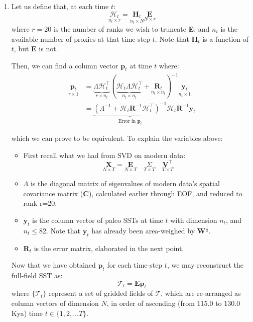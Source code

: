 \documentclass{article}
\begin{document}
\begin{enumerate}
    \item Let us define that, at each time $t$:
    $$\underset{n_t \times r}{\mathcal{H}_t} = \underset{n_t \times N}{\mathbf{H}_t} \underset{N \times r}{\mathbf{E}}$$
    where $r=20$ is the number of ranks we wish to truncate \textbf{E}, and $n_t$ is the available number of proxies at that time-step $t$. Note that $\textbf{H}_t$ is a function of $t$, but \textbf{E} is not.
    
    Then, we can find a column vector $\textbf{p}_t$ at time $t$ where:
        \begin{align*}
            \underset{r \times 1}{\textbf{p}_t} &= \underbrace{\Lambda \mathcal{H}_t^\intercal}_{r \times n_t} (\underbrace{\mathcal{H}_t \Lambda \mathcal{H}_t^\intercal}_{n_t \times n_t} + \underset{n_t \times n_t}{\textbf{R}_t})^{-1} \underset{n_t  \times 1}{\textbf{y}_t} \\
            &= \underbrace{(\Lambda^{-1} + \mathcal{H}_t\mathbf{R}^{-1}\mathcal{H}_t^\intercal)^{-1} }_{\text{Error in } \textbf{p}_t} \mathcal{H}_t\mathbf{R}^{-1} \mathbf{y}_t
        \end{align*}
        
        which we can prove to be equivalent. To explain the variables above:
        \begin{itemize}
            \item First recall what we had from SVD on modern data:
            $$\underset{N \times T}{\textbf{X}} = \underset{N \times T}{\textbf{E}} \quad \underset{T \times T}{\Sigma} \quad \underset{T \times T}{\textbf{V}^\intercal}$$
            
            \item $\Lambda$ is the diagonal matrix of eigenvalues of modern data's spatial covariance matrix (\textbf{C}), calculated earlier through EOF, and reduced to rank r=20.
            
            \item $\textbf{y}_t$ is the column vector of paleo SSTs at time $t$ with dimension $n_t$, and $n_t \leq 82$. Note that $\textbf{y}_t$ has already been area-weighed by $\textbf{W}^{\frac{1}{2}}$.
            
            \item $\textbf{R}_t$ is the error matrix, elaborated in the next point.
        \end{itemize}
    Now that we have obtained $\textbf{p}_t$ for each time-step $t$, we may reconstruct the full-field SST as:
    $$\mathcal{T}_t = \textbf{E} \textbf{p}_t$$
    where $\{\mathcal{T}_t\}$ represent a set of gridded fields of $\mathcal{T}$, which are re-arranged as column vectors of dimension $N$, in order of ascending (from 115.0 to 130.0 Kya) time $t \in \{1, 2, \dots T\}$.
    

\end{enumerate}
\end{document}
